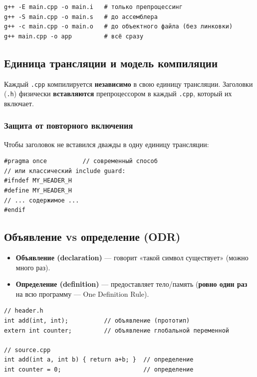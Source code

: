 \begin{lstlisting}
g++ -E main.cpp -o main.i   # только препроцессинг
g++ -S main.cpp -o main.s   # до ассемблера
g++ -c main.cpp -o main.o   # до объектного файла (без линковки)
g++ main.cpp -o app         # всё сразу
\end{lstlisting}

\subsection{Единица трансляции и модель компиляции}

Каждый \texttt{.cpp} компилируется \textbf{независимо} в свою единицу трансляции.
Заголовки (\texttt{.h}) физически \textbf{вставляются} препроцессором в каждый
\texttt{.cpp}, который их включает.

\subsubsection{Защита от повторного включения}

Чтобы заголовок не вставился дважды в одну единицу трансляции:

\begin{lstlisting}
#pragma once          // современный способ
// или классический include guard:
#ifndef MY_HEADER_H
#define MY_HEADER_H
// ... содержимое ...
#endif
\end{lstlisting}

\subsection{Объявление vs определение (ODR)}

\begin{itemize}[leftmargin=2em]
    \item \textbf{Объявление (declaration)} --- говорит «такой символ существует»
          (можно много раз).
    \item \textbf{Определение (definition)} --- предоставляет тело/память
          (\textbf{ровно один раз} на всю программу --- One Definition Rule).
\end{itemize}

\begin{lstlisting}
// header.h
int add(int, int);          // объявление (прототип)
extern int counter;         // объявление глобальной переменной

// source.cpp
int add(int a, int b) { return a+b; }  // определение
int counter = 0;                       // определение
\end{lstlisting}

